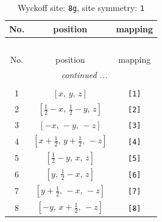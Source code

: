 \documentclass[fleqn,8pt]{jsarticle}
\begin{document}
\renewcommand{\arraystretch}{1.2}
\begin{longtable}{ccc}
\caption{Wyckoff site: {\tt 8g}, site symmetry: {\tt 1}}
 \\
 \hline \hline
No. & position & mapping \\ \hline \endfirsthead

\multicolumn{2}{l}{\tablename\ \thetable{}} \\
 \hline \hline
No. & position & mapping \\ \hline \endhead

 \hline \hline
\multicolumn{2}{r}{\footnotesize\it continued ...} \\ \endfoot

 \hline \hline
\multicolumn{2}{r}{} \\ \endlastfoot

1 & $\left[ x,\, y,\, z \right]$ & {\tt [1]} \\ \hline
2 & $\left[ \frac{1}{2} - x,\, \frac{1}{2} - y,\, z \right]$ & {\tt [2]} \\ \hline
3 & $\left[ - x,\, - y,\, - z \right]$ & {\tt [3]} \\ \hline
4 & $\left[ x + \frac{1}{2},\, y + \frac{1}{2},\, - z \right]$ & {\tt [4]} \\ \hline
5 & $\left[ \frac{1}{2} - y,\, x,\, z \right]$ & {\tt [5]} \\ \hline
6 & $\left[ y,\, \frac{1}{2} - x,\, z \right]$ & {\tt [6]} \\ \hline
7 & $\left[ y + \frac{1}{2},\, - x,\, - z \right]$ & {\tt [7]} \\ \hline
8 & $\left[ - y,\, x + \frac{1}{2},\, - z \right]$ & {\tt [8]} \\
\end{longtable}
\end{document}
